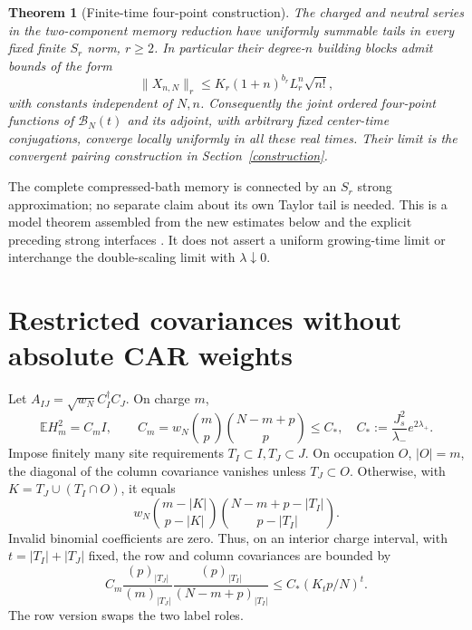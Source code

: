 \documentclass[11pt]{article}
\newcommand{\EE}{\mathbb E}
\newcommand{\BB}{\mathcal B}
\newtheorem{theorem}{Theorem}
\begin{document}
\newpage
\begin{theorem}[Finite-time four-point construction]\label{thm}
The charged and neutral series in the two-component memory reduction
have uniformly summable tails in every fixed finite $S_r$ norm,
$r\ge2$. In particular their
degree-$n$ building blocks admit bounds of the form
\begin{equation}\label{envelope}
 \|X_{n,N}\|_r\le K_r(1+n)^{b_r}L_r^n\sqrt{n!},
\end{equation}
with constants independent of $N,n$. Consequently the joint ordered
four-point functions of $\BB_N(t)$ and its adjoint, with arbitrary
fixed center-time conjugations, converge locally uniformly in all
these real times. Their limit is the convergent pairing construction
in Section~\ref{construction}.
\end{theorem}
The complete compressed-bath memory is connected by an $S_r$ strong
approximation; no separate claim about its own Taylor tail is needed.
This is a model theorem assembled from the new estimates below and
the explicit preceding strong interfaces \cite{Four,Joint,Recon}.
It does not assert a uniform growing-time limit or interchange the
double-scaling limit with $\lambda\downarrow0$.

\section{Restricted covariances without absolute CAR weights}
Let $A_{IJ}=\sqrt{w_N}C_I^\dagger C_J$. On charge $m$,
\begin{equation}
 \EE H_m^2=C_mI,\qquad
 C_m=w_N\binom mp\binom{N-m+p}p\le C_*,
 \quad C_*:=\frac{J_s^2}{\lambda_-}e^{2\lambda_+}.
\end{equation}
Impose finitely many site requirements $T_I\subset I,T_J\subset J$.
On occupation $O$, $|O|=m$, the diagonal of the column covariance
vanishes unless $T_J\subset O$. Otherwise, with
$K=T_J\cup(T_I\cap O)$, it equals
\begin{equation}
 w_N\binom{m-|K|}{p-|K|}
       \binom{N-m+p-|T_I|}{p-|T_I|}.
\end{equation}
Invalid binomial coefficients are zero. Thus, on an interior charge
interval, with $t=|T_I|+|T_J|$ fixed, the row and column covariances
are bounded by
\begin{equation}\label{restricted}
 C_m\frac{(p)_{|T_J|}}{(m)_{|T_J|}}
       \frac{(p)_{|T_I|}}{(N-m+p)_{|T_I|}}
 \le C_* (K_t p/N)^t.
\end{equation}
The row version swaps the two label roles.
\end{document}
